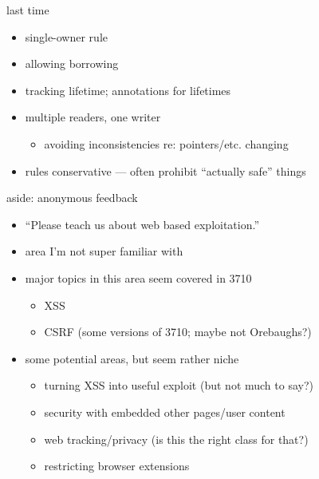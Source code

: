 \date{}
\title{}
\date{}
\usepackage[outputdir=latex.out]{minted}

\begin{frame}
    \titlepage
\end{frame}

\begin{frame}{last time}
    \begin{itemize}
    \item single-owner rule
    \item allowing borrowing
    \item tracking lifetime; annotations for lifetimes
    \item multiple readers, one writer
        \begin{itemize}
        \item avoiding inconsistencies re: pointers/etc. changing
        \end{itemize}
    \item rules conservative --- often prohibit ``actually safe'' things
    \end{itemize}
\end{frame}



\begin{frame}{aside: anonymous feedback}
    \begin{itemize}
    \item ``Please teach us about web based exploitation.''
    \item area I'm not super familiar with
    \item major topics in this area seem covered in 3710
        \begin{itemize}
        \item XSS 
        \item CSRF (some versions of 3710; maybe not Orebaughs?)
        \end{itemize}
    \item some potential areas, but seem rather niche
        \begin{itemize}
        \item turning XSS into useful exploit (but not much to say?)
        \item security with embedded other pages/user content
        \item web tracking/privacy (is this the right class for that?)
        \item restricting browser extensions
        \end{itemize}
    \end{itemize}
\end{frame}

